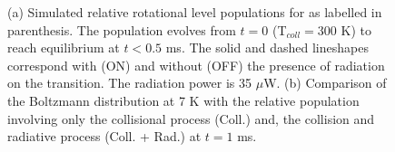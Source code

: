 \begin{figure}[!htb]
    \hfill
    \caption{(a) Simulated relative rotational level populations for \CD as labelled in parenthesis. The population 
    evolves from $t=0$ (T$_{coll}=300$ K) to reach equilibrium at $t<0.5$ ms. The solid and dashed lineshapes 
    correspond with (ON) and without (OFF) the presence of radiation on the \CD \CDline transition. The radiation power 
    is 35 $\mu$W. (b) Comparison of the Boltzmann distribution at 7 K with the relative population involving only 
    the collisional process (Coll.) and, the collision and radiative process (Coll. + Rad.) at $t=1$ ms.}
    \label{fig:ROSAA-sim-coll-rad-population-boltzmann}
\end{figure}
